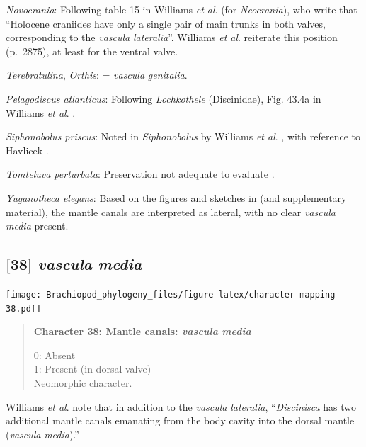 \documentclass[openany]{book}
\begin{document}
\hypertarget{Novocrania-coding-37}{}
\emph{Novocrania}: Following table 15 in Williams \emph{et al}.
\citeyearpar{Williams2000LinguliformeaCraniiformea} (for
\emph{Neocrania}), who write that ``Holocene craniides have only a
single pair of main trunks in both valves, corresponding to the
\emph{vascula} \emph{lateralia}''. Williams \emph{et al}.
\citeyearpar{Williams2007Supplement} reiterate this position (p.~2875),
at least for the ventral valve.

\hypertarget{Orthis-coding-37}{}
\emph{Terebratulina}, \emph{Orthis}: = \emph{vascula} \emph{genitalia}.

\hypertarget{Pelagodiscus_atlanticus-coding-37}{}
\emph{Pelagodiscus atlanticus}: Following \emph{Lochkothele}
(Discinidae), Fig. 43.4a in Williams \emph{et al}.
\citeyearpar{Williams2000LinguliformeaCraniiformea}.

\hypertarget{Siphonobolus_priscus-coding-37}{}
\emph{Siphonobolus priscus}: Noted in \emph{Siphonobolus} by Williams
\emph{et al}. \citeyearpar{Williams2000LinguliformeaCraniiformea}, with
reference to Havlicek \citeyearpar{Havlicek1982LingulaceaPaterinacea}.

\hypertarget{Tomteluva_perturbata-coding-37}{}
\emph{Tomteluva perturbata}: Preservation not adequate to evaluate
\citep{Streng2016Anew}.

\hypertarget{Yuganotheca_elegans-coding-37}{}
\emph{Yuganotheca elegans}: Based on the figures and sketches in
\citet{Zhang2014Anearly} (and supplementary material), the mantle canals
are interpreted as lateral, with no clear \emph{vascula} \emph{media}
present.

\subsection*{\texorpdfstring{{[}38{]} \emph{vascula}
\emph{media}}{{[}38{]} vascula media}}\label{vascula-media}

\texttt{[image: Brachiopod\_phylogeny\_files/figure-latex/character-mapping-38.pdf]}

\begin{quote}
\textbf{Character 38: Mantle canals: \emph{vascula} \emph{media}}

0: Absent\\
1: Present (in dorsal valve)\\
Neomorphic character.
\end{quote}

Williams \emph{et al}. \citeyearpar{Williams1997Introduction} note that
in addition to the \emph{vascula} \emph{lateralia}, ``\emph{Discinisca}
has two additional mantle canals emanating from the body cavity into the
dorsal mantle (\emph{vascula} \emph{media}).''
\end{document}
